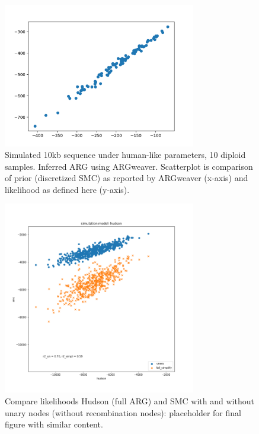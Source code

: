 \documentclass{article}
\begin{document}
\begin{figure}[!ht]
\centering
\includegraphics[width=0.75\textwidth]{figures/supplementary-figs/argweaver_vs_runsmc.png}
\caption{Simulated 10kb sequence under human-like parameters, 10 diploid samples. Inferred ARG using ARGweaver. Scatterplot is comparison of prior (discretized SMC) as reported by ARGweaver (x-axis) and likelihood as defined here (y-axis).}
 \label{sup:fig:vs-argweaver}
\end{figure}


\begin{figure}[!ht]
\centering
\includegraphics[width=0.75\textwidth]{figures/supplementary-figs/v_hudson_unary_simpl.png}
\caption{Compare likelihoods Hudson (full ARG) and SMC with and without unary nodes (without recombination nodes): placeholder for final figure with similar content.}
\label{sup:fig:vs-hudson}
\end{figure}
\end{document}
